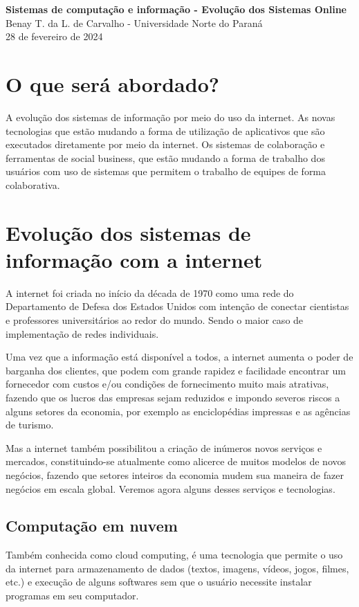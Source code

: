 \documentclass[12pt]{article}
\begin{document}
\begin{center}
    {\large
    \textbf{Sistemas de computação e informação - Evolução dos Sistemas
    Online\\}
    Benay T. da L. de Carvalho - Universidade Norte do Paraná\\
    28 de fevereiro de 2024
    }
\end{center}

\indent
\section{O que será abordado?}
A evolução dos sistemas de informação por meio do uso da internet.
As novas tecnologias que estão mudando a forma
de utilização de aplicativos que são executados
diretamente por meio da internet. Os sistemas
de colaboração e ferramentas de social business, que
estão mudando a forma de trabalho dos usuários
com uso de sistemas que permitem o trabalho de equipes
de forma colaborativa.

\indent
\section{Evolução dos sistemas de informação com a internet}
A internet foi criada no início da década de 1970 como uma rede do Departamento
de Defesa dos Estados Unidos com intenção de conectar cientistas e professores
universitários ao redor do mundo. Sendo o maior caso de implementação de 
redes individuais. 

Uma vez que a informação está disponível a todos,
a internet aumenta o poder de barganha dos clientes, que podem com grande rapidez
e facilidade encontrar um fornecedor com custos e/ou condições de fornecimento
muito mais atrativas, fazendo que os lucros das empresas sejam reduzidos e impondo
severos riscos a alguns setores da economia, por exemplo as enciclopédias impressas
e as agências de turismo.

Mas a internet também possibilitou a criação de inúmeros novos serviços e mercados,
constituindo-se atualmente como alicerce de muitos modelos de novos negócios,
fazendo que setores inteiros da economia mudem sua maneira de fazer negócios em
escala global. Veremos agora alguns desses serviços e tecnologias.

\indent
\subsection{Computação em nuvem}
Também conhecida como cloud computing, é uma tecnologia que permite o uso da internet
para armazenamento de dados (textos, imagens, vídeos, jogos, filmes, etc.) e
execução de alguns softwares sem que o usuário necessite instalar programas em seu
computador.
\end{document}
